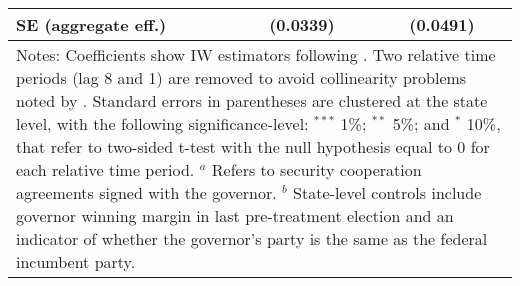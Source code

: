 \begin{table}[htbp]
{\begin{tabular}{lcc}
SE (aggregate eff.)        &              (0.0339)       &           (0.0491)   \\
\hline \hline
\multicolumn{3}{p{0.8\textwidth}}{\footnotesize{Notes: Coefficients show IW estimators following \citet{abraham_sun_2020}. Two relative time periods (lag 8 and 1) are removed to avoid collinearity problems noted by \citet{abraham_sun_2020}. Standard errors in parentheses are clustered at the state level, with the following significance-level: $^{***}$ 1\%; $^{**}$ 5\%; and $^*$ 10\%, that refer to two-sided t-test with the null hypothesis equal to 0 for each relative time period. $^a$ Refers to security cooperation agreements signed with the governor. $^b$ State-level controls include governor winning margin in last pre-treatment election and an indicator of whether the governor's party is the same as the federal incumbent party.}} \\
\end{tabular}
}
\end{table}
